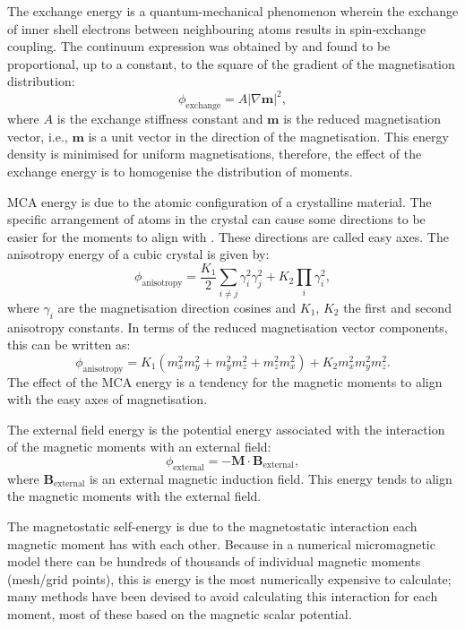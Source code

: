 The exchange energy is a quantum-mechanical phenomenon wherein the exchange of inner shell electrons between neighbouring atoms results in spin-exchange coupling. The continuum expression was obtained by \citet{Landau1935} and found to be proportional, up to a constant, to the square of the gradient of the magnetisation distribution:
\begin{equation}
\phi_{\text{exchange}} = A | \nabla \boldsymbol{m} |^2,
\end{equation}
where $A$ is the exchange stiffness constant and $\boldsymbol{m}$ is the reduced magnetisation vector, i.e., $\boldsymbol{m}$ is a unit vector in the direction of the magnetisation. This energy density is minimised for uniform magnetisations, therefore, the effect of the exchange energy is to homogenise the distribution of moments.\par

MCA energy is due to the atomic configuration of a crystalline material. The specific arrangement of atoms in the crystal can cause some directions to be easier for the moments to align with \citep{Kittel1949}. These directions are called easy axes. The anisotropy energy of a cubic crystal is given by:
\begin{equation}
\phi_{\text{anisotropy}}=\frac{K_1}{2}\sum_{i\neq j}\gamma_i^2\gamma_j^2 + K_2\prod_i\gamma_i^2,
\end{equation}
where $\gamma_i$ are the magnetisation direction cosines and $K_1$, $K_2$ the first and second anisotropy constants. In terms of the reduced magnetisation vector components, this can be written as:
\begin{equation}
\phi_{\text{anisotropy}}=K_1(m_x^2m_y^2+m_y^2m_z^2+m_z^2m_x^2) + K_2m_x^2m_y^2m_z^2.
\end{equation}
The effect of the MCA energy is a tendency for the magnetic moments to align with the easy axes of magnetisation.\par

The external field energy is the potential energy associated with the interaction of the magnetic moments with an external field:
\begin{equation}
\phi_{\text{external}} = -\boldsymbol{M} \cdot \boldsymbol{B}_{\text{external}},
\end{equation}
where $\boldsymbol{B}_{\text{external}}$ is an external magnetic induction field. This energy tends to align the magnetic moments with the external field.\par

The magnetostatic self-energy is due to the magnetostatic interaction each magnetic moment has with each other. Because in a numerical micromagnetic model there can be hundreds of thousands of individual magnetic moments (mesh/grid points), this is energy is the most numerically expensive to calculate; many methods have been devised to avoid calculating this interaction for each moment, most of these based on the magnetic scalar potential.\par

